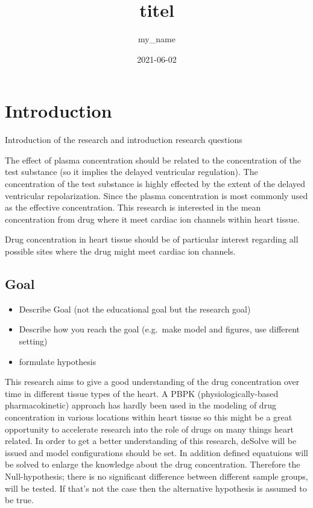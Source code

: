 \documentclass[
]{article}
\title{titel}
\author{my\_name}
\date{2021-06-02}
\providecommand{\tightlist}{%
  \setlength{\itemsep}{0pt}\setlength{\parskip}{0pt}}
\begin{document}
\maketitle

\hypertarget{introduction}{%
\section{Introduction}\label{introduction}}

Introduction of the research and introduction research questions

The effect of plasma concentration should be related to the
concentration of the test substance (so it implies the delayed
ventricular regulation). The concentration of the test substance is
highly effected by the extent of the delayed ventricular repolarization.
Since the plasma concentration is most commonly used as the effective
concentration. This research is interested in the mean concentration
from drug where it meet cardiac ion channels within heart tissue.

Drug concentration in heart tissue should be of particular interest
regarding all possible sites where the drug might meet cardiac ion
channels.

\hypertarget{goal}{%
\subsection{Goal}\label{goal}}

\begin{itemize}
\tightlist
\item
  Describe Goal (not the educational goal but the research goal)
\item
  Describe how you reach the goal (e.g.~make model and figures, use
  different setting)
\item
  formulate hypothesis
\end{itemize}

This research aims to give a good understanding of the drug
concentration over time in different tissue types of the heart. A PBPK
(physiologically-based pharmacokinetic) approach has hardly been used in
the modeling of drug concentration in various locations within heart
tissue so this might be a great opportunity to accelerate research into
the role of drugs on many things heart related. In order to get a better
understanding of this research, deSolve will be issued and model
configurations should be set. In addition defined equatuions will be
solved to enlarge the knowledge about the drug concentration. Therefore
the Null-hypothesis; there is no significant difference between
different sample groups, will be tested. If that's not the case then the
alternative hypothesis is assumed to be true.
\end{document}
